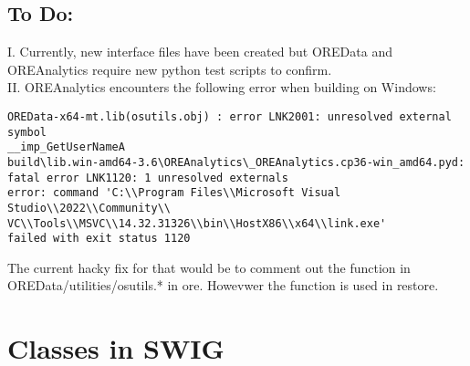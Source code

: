 \documentclass[10pt]{article}
\begin{document}
\subsection*{To Do:}
I. Currently, new interface files have been created but OREData and OREAnalytics require new python test scripts to confirm. \\

II. OREAnalytics encounters the following error when building on Windows:
\begin{lstlisting}[basicstyle=\small]
OREData-x64-mt.lib(osutils.obj) : error LNK2001: unresolved external symbol
__imp_GetUserNameA
build\lib.win-amd64-3.6\OREAnalytics\_OREAnalytics.cp36-win_amd64.pyd:
fatal error LNK1120: 1 unresolved externals
error: command 'C:\\Program Files\\Microsoft Visual Studio\\2022\\Community\\
VC\\Tools\\MSVC\\14.32.31326\\bin\\HostX86\\x64\\link.exe'
failed with exit status 1120
\end{lstlisting}
The current hacky fix for that would be to comment out the function in OREData/utilities/osutils.* in ore. Howevwer the function is used in restore.



\pagebreak
\section*{Classes in SWIG}
\end{document}
